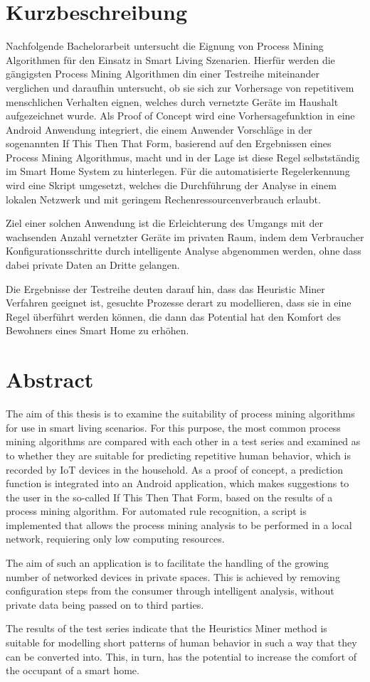 \chapter*{Kurzbeschreibung}\vspace{17mm}
Nachfolgende Bachelorarbeit untersucht die Eignung von Process Mining Algorithmen für den Einsatz in Smart Living Szenarien. Hierfür werden die gängigsten Process Mining Algorithmen din einer Testreihe miteinander verglichen und daraufhin untersucht, ob sie sich zur Vorhersage von repetitivem menschlichen Verhalten eignen, welches durch vernetzte Geräte im Haushalt aufgezeichnet wurde. Als Proof of Concept wird eine Vorhersagefunktion in eine Android Anwendung integriert, die einem Anwender Vorschläge in der sogenannten If This Then That Form, basierend auf den Ergebnissen eines Process Mining Algorithmus, macht und in der Lage ist diese Regel selbstständig im Smart Home System zu hinterlegen. Für die automatisierte Regelerkennung wird eine Skript umgesetzt, welches die Durchführung der Analyse in einem lokalen Netzwerk und mit geringem Rechenressourcenverbrauch erlaubt. 

Ziel einer solchen Anwendung ist die Erleichterung des Umgangs mit der wachsenden Anzahl vernetzter Geräte im privaten Raum, indem dem Verbraucher Konfigurationsschritte durch intelligente Analyse abgenommen werden, ohne dass dabei private Daten an Dritte gelangen. 

Die Ergebnisse der Testreihe deuten darauf hin, dass das Heuristic Miner Verfahren geeignet ist, gesuchte Prozesse derart zu modellieren, dass sie in eine Regel überführt werden können, die dann das Potential hat den Komfort des Bewohners eines Smart Home zu erhöhen.
\newpage
\chapter*{Abstract}\vspace{17mm}
The aim of this thesis is to examine the suitability of process mining algorithms for use in smart living scenarios. For this purpose, the most common process mining algorithms are compared with each other in a test series and examined as to whether they are suitable for predicting repetitive human behavior, which is  recorded by IoT devices in the household. As a proof of concept, a prediction function is integrated into an Android application, which makes suggestions to the user in the so-called If This Then That Form, based on the results of a process mining algorithm. 
For automated rule recognition, a script is implemented that allows the process mining analysis to be performed in a local network, requiering only low computing resources. 

The aim of such an application is to facilitate the handling of the growing number of networked devices in private spaces. This is achieved by removing configuration steps from the consumer through intelligent analysis, without private data being passed on to third parties. 

The results of the test series indicate that the Heuristics Miner method is suitable for modelling short patterns of human behavior in such a way that they can be converted into. This, in turn, has the potential to increase the comfort of the occupant of a smart home.
